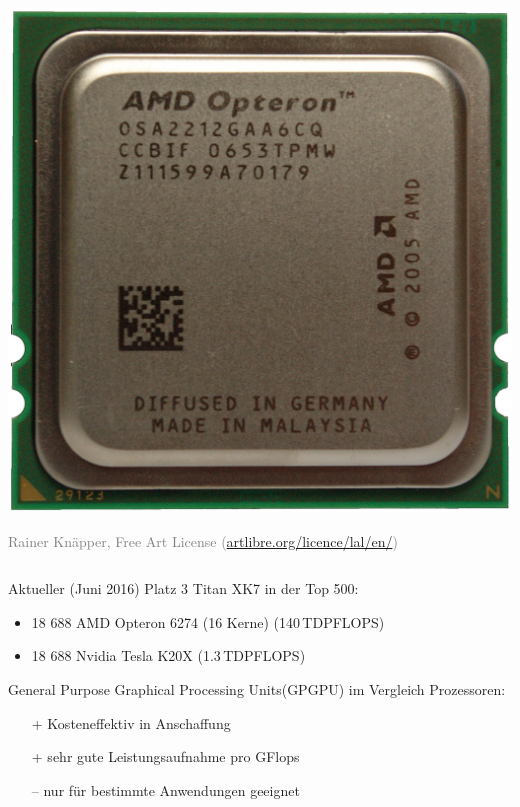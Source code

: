 \begin{frame}
\begin{columns}
\begin{column}{0.5\linewidth}
        \centerline{\includegraphics[height=0.1\textheight]{AMD_Opteron_2212_IMGP1795.jpg}}
        \textcolor{gray}{\scriptsize{Rainer Knäpper, Free Art License (\url{artlibre.org/licence/lal/en/})}}
    \end{column}\end{columns}
    Aktueller (Juni 2016) Platz 3 Titan XK7 in der Top 500:
    \begin{itemize}
        \item 18 688 AMD Opteron 6274 (16 Kerne) (140\,TDPFLOPS)
        \item 18 688 Nvidia Tesla K20X (1.3\,TDPFLOPS)  %
    \end{itemize}
    General Purpose Graphical Processing Units(GPGPU) im Vergleich Prozessoren:
    \begin{itemize}
        \item[+] Kosteneffektiv in Anschaffung
        \item[+] sehr gute Leistungsaufnahme pro GFlops
        \item[–] nur für bestimmte Anwendungen geeignet

\end{itemize}
\end{frame}

